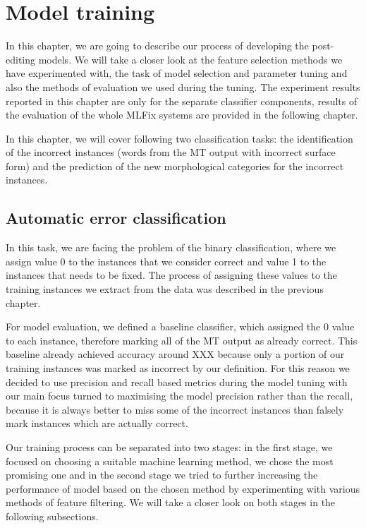 \chapter{Model training}
\label{chap:tuning}

In this chapter, we are going to describe our process of developing
the post-editing models. We will take a closer look at the feature selection
methods we have experimented with, the task of model selection and parameter
tuning and also the methods of evaluation we used during the tuning.
The experiment results reported in this chapter are only for the separate
classifier components, results of the evaluation of the whole MLFix systems
are provided in the following chapter.

In this chapter, we will cover following two classification tasks: the identification
of the incorrect instances (words from the MT output with incorrect surface form)
and the prediction of the new morphological categories for the incorrect instances.

\section{Automatic error classification}


In this task, we are facing the problem of the binary classification, where we
assign value 0 to the instances that we consider correct and value 1 to the
instances that needs to be fixed. The process of assigning these values to the
training instances we extract from the data was described in the previous chapter.

For model evaluation, we defined a baseline classifier, which assigned the 0 value
to each instance, therefore marking all of the MT output as already correct.
This baseline already achieved accuracy around XXX because only a portion of our
training instances was marked as incorrect by our definition. For this reason
we decided to use precision and recall based metrics during the model tuning with
our main focus turned to maximising the model precision rather than the recall,
because it is always better to miss some of the incorrect instances than falsely mark
instances which are actually correct.

Our training process can be separated into two stages: in the first stage, we
focused on choosing a suitable machine learning method, we chose the most promising
one and in the second stage we tried to further increasing the performance of model
based on the chosen method by experimenting with various methods of feature filtering.
We will take a closer look on both stages in the following subsections.

